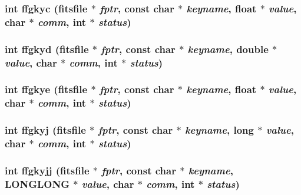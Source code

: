 \subsubsection{\setlength{\rightskip}{0pt plus 5cm}int ffgkyc (\bf{fitsfile} $\ast$ {\em fptr}, const char $\ast$ {\em keyname}, float $\ast$ {\em value}, char $\ast$ {\em comm}, int $\ast$ {\em status})}\label{fitsio__64_8h_647528834240eb725de251c7cec34850}


\subsubsection{\setlength{\rightskip}{0pt plus 5cm}int ffgkyd (\bf{fitsfile} $\ast$ {\em fptr}, const char $\ast$ {\em keyname}, double $\ast$ {\em value}, char $\ast$ {\em comm}, int $\ast$ {\em status})}\label{fitsio__64_8h_7f11b595f4dd81df24a8e0f95198e9d0}


\subsubsection{\setlength{\rightskip}{0pt plus 5cm}int ffgkye (\bf{fitsfile} $\ast$ {\em fptr}, const char $\ast$ {\em keyname}, float $\ast$ {\em value}, char $\ast$ {\em comm}, int $\ast$ {\em status})}\label{fitsio__64_8h_765b39f911a7fa630490fcc7c22b7da7}


\subsubsection{\setlength{\rightskip}{0pt plus 5cm}int ffgkyj (\bf{fitsfile} $\ast$ {\em fptr}, const char $\ast$ {\em keyname}, long $\ast$ {\em value}, char $\ast$ {\em comm}, int $\ast$ {\em status})}\label{fitsio__64_8h_390adabb4fae20ebb831ef865b10cab7}


\subsubsection{\setlength{\rightskip}{0pt plus 5cm}int ffgkyjj (\bf{fitsfile} $\ast$ {\em fptr}, const char $\ast$ {\em keyname}, \bf{LONGLONG} $\ast$ {\em value}, char $\ast$ {\em comm}, int $\ast$ {\em status})}\label{fitsio__64_8h_6ad49eda5b9e0d9b57def9abc3f60fe5}



